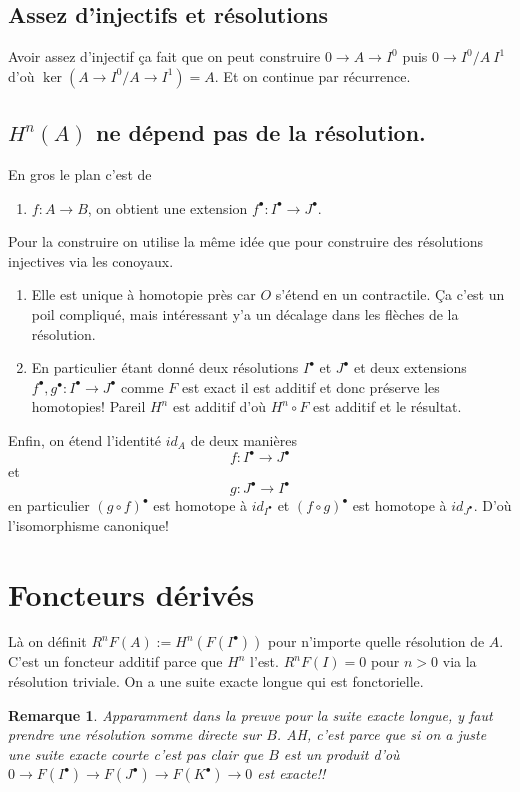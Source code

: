 \documentclass[a4paper,12pt]{book}
\theoremstyle{plain}
\newtheorem{rem}{Remarque}
\theoremstyle{definition}
\theoremstyle{remark}
\begin{document}
\subsection{Assez d'injectifs et résolutions}
Avoir assez d'injectif ça fait que on peut construire 
$0\to A\to I^0$ puis $0\to I^0/A\ I^1$ d'où 
$\ker(A\to I^0/A\to I^1)=A$. Et on continue par récurrence. 

\subsection{$H^n(A)$ ne dépend pas de la résolution.}
En gros le plan c'est de 
\begin{enumerate}
  \item $f\colon A\to B$, on obtient une extension $f^\bullet\colon
    I^\bullet\to J^\bullet$.
\end{enumerate}
Pour la construire on utilise la même idée que pour construire
des résolutions injectives via les conoyaux. 
\begin{enumerate}
  \item Elle est unique à homotopie près car $O$ s'étend en
    un contractile. Ça c'est un poil compliqué, mais intéressant
    y'a un décalage dans les flèches de la résolution.
  \item En particulier étant donné deux résolutions $I^\bullet$
    et $J^\bullet$ et deux extensions $f^\bullet,g^\bullet\colon 
    I^\bullet\to J^\bullet$ comme $F$ est exact il est additif
    et donc préserve les homotopies! Pareil $H^n$ est 
    additif d'où $H^n\circ F$ est additif et le résultat.
\end{enumerate}
Enfin, on étend l'identité $id_A$ de deux manières
\[f\colon I^\bullet \to J^\bullet\]
et
\[g\colon J^\bullet \to I^\bullet\]
en particulier $(g\circ f)^\bullet$ est homotope à $id_{I^\bullet}$
et $(f\circ g)^\bullet$ est homotope à $id_{J^\bullet}$. D'où 
l'isomorphisme canonique!


\section{Foncteurs dérivés}
Là on définit $R^nF(A):=H^n(F(I^\bullet))$ pour n'importe quelle
résolution de $A$. C'est un foncteur additif parce que $H^n$ l'est.
$R^nF(I)=0$ pour $n>0$ via la résolution triviale. On a une
suite exacte longue qui est fonctorielle.

\begin{rem}
  Apparamment dans la preuve pour la suite exacte longue, y faut
  prendre une résolution somme directe sur $B$. AH, c'est parce
  que si on a juste une suite exacte courte c'est pas clair
  que $B$ est un produit d'où $0\to F(I^\bullet)\to F(J^\bullet)\to
  F(K^\bullet)\to 0$ est exacte!!
\end{rem}
\end{document}
